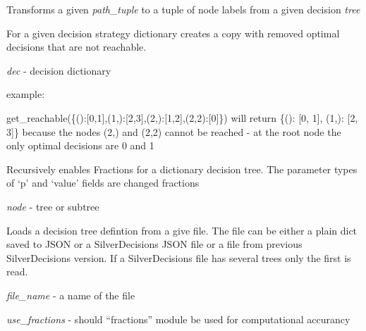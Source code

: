 \documentclass[a4paper,10pt,english]{sphinxmanual}
\begin{document}

\begin{fulllineitems}
	\label{index:chondro.get_decision_name}
	Transforms a given \emph{path\_tuple} to a tuple of node labels from 
	a given decision \emph{tree}
	
\end{fulllineitems}


\begin{fulllineitems}
	\label{index:chondro.get_reachable}
	For a given decision strategy dictionary creates a copy 
	with removed optimal decisions that are not reachable.
	
	\emph{dec} - decision dictionary
	
	example:
	
	get\_reachable(\{():{[}0,1{]},(1,):{[}2,3{]},(2,):{[}1,2{]},(2,2):{[}0{]}\})      will return  \{(): {[}0, 1{]}, (1,): {[}2, 3{]}\} because the nodes (2,) and (2,2)     cannot be reached - at the root node the only optimal decisions are 0 and 1
	
\end{fulllineitems}


\begin{fulllineitems}
	\label{index:chondro.go_fractions}
	Recursively enables Fractions for a dictionary decision tree.
	The parameter types of `p' and `value' fields are changed fractions
	
	\emph{node} - tree or subtree
	
\end{fulllineitems}


\begin{fulllineitems}
	\label{index:chondro.load_tree}
	
	Loads a decision tree defintion from a give file.
	The file can be either a plain dict saved to JSON or a SilverDecisions JSON
	file or a file from previous SilverDecisions version. 
	If a SilverDecisions file has several trees only the first is read.
	
	\emph{file\_name} - a name of the file
	
	\emph{use\_fractions} - should ``fractions'' module be used for computational     accurancy
	
\end{fulllineitems}
\end{document}
